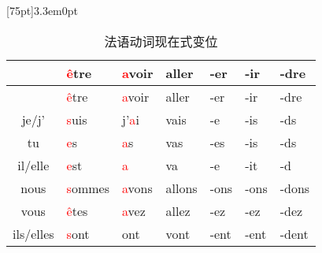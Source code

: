 \documentclass[12pt,A4paper,oneside,reqno]{amsart}
\numberwithin{equation}{section}
\theoremstyle{plain}
\theoremstyle{plain}
\theoremstyle{plain}
\numberwithin{equation}{section}
\theoremstyle{remark}
\begin{document}
\begin{multicols}{2}       %

[75pt]{}{3.3em}{0pt}


\end{multicols}



	\begin{longtable}{c|l|l|l|l|l|l}
	\hline
	&	\textcolor{red}{\^{e}}tre	&	\textcolor{red}{a}voir	&	aller	&	-er	&	-ir	&	-dre	\\
	\hline
	\endhead
	\hline
	&	\textcolor{red}{\^{e}}tre	&	\textcolor{red}{a}voir	&	aller	&	-er	&	-ir	&	-dre	\\
	\hline
	\endfirsthead	
	\hline
	\endfoot
	\hline		
		\caption{法语动词现在式变位}
	\endlastfoot
je/j'	&	\textcolor{red}{s}uis	&	j'\textcolor{red}{a}i	&	vais	&	-e	&	-is	&	-ds	\\
tu	&	\textcolor{red}{e}s	&	\phantom{j'}\textcolor{red}{a}s	&	vas	&	-es	&	-is	&	-ds	\\
il/elle	&	\textcolor{red}{e}st	&	\phantom{j'}\textcolor{red}{a}	&	va	&	-e	&	-it	&	-d	\\
nous	&	\textcolor{red}{s}ommes	&	\phantom{j'}\textcolor{red}{a}vons	&	allons	&	-ons	&	-ons	&	-dons	\\
vous	&	\textcolor{red}{\^{e}}tes	&	\phantom{j'}\textcolor{red}{a}vez	&	allez	&	-ez	&	-ez	&	-dez	\\
ils/elles	&	\textcolor{red}{s}ont	&	\phantom{j'a}ont	&	vont	&	-ent	&	-ent	&	-dent	\\

		
			\hline								
			\end{longtable}
\end{document}
